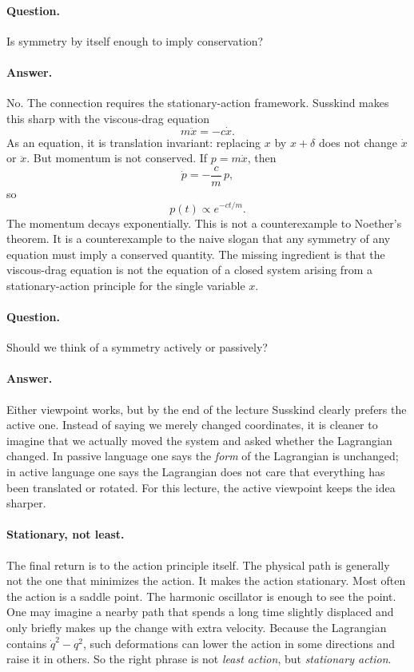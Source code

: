 \paragraph{Question.} Is symmetry by itself enough to imply conservation?

\paragraph{Answer.} No. The connection requires the stationary-action framework. Susskind makes this sharp with the viscous-drag equation
\begin{equation}
m\ddot x=-c\dot x.
\end{equation}
As an equation, it is translation invariant: replacing \(x\) by \(x+\delta\) does not change \(\dot x\) or \(\ddot x\). But momentum is not conserved. If \(p=m\dot x\), then
\begin{equation}
\dot p=-\frac{c}{m}\,p,
\end{equation}
so
\begin{equation}
p(t)\propto e^{-ct/m}.
\end{equation}
The momentum decays exponentially. This is not a counterexample to Noether's theorem. It is a counterexample to the naive slogan that any symmetry of any equation must imply a conserved quantity. The missing ingredient is that the viscous-drag equation is not the equation of a closed system arising from a stationary-action principle for the single variable \(x\).

\paragraph{Question.} Should we think of a symmetry actively or passively?

\paragraph{Answer.} Either viewpoint works, but by the end of the lecture Susskind clearly prefers the active one. Instead of saying we merely changed coordinates, it is cleaner to imagine that we actually moved the system and asked whether the Lagrangian changed. In passive language one says the \emph{form} of the Lagrangian is unchanged; in active language one says the Lagrangian does not care that everything has been translated or rotated. For this lecture, the active viewpoint keeps the idea sharper.

\paragraph{Stationary, not least.} The final return is to the action principle itself. The physical path is generally not the one that minimizes the action. It makes the action stationary. Most often the action is a saddle point. The harmonic oscillator is enough to see the point. One may imagine a nearby path that spends a long time slightly displaced and only briefly makes up the change with extra velocity. Because the Lagrangian contains \(\dot q^2-q^2\), such deformations can lower the action in some directions and raise it in others. So the right phrase is not \emph{least action}, but \emph{stationary action}.


